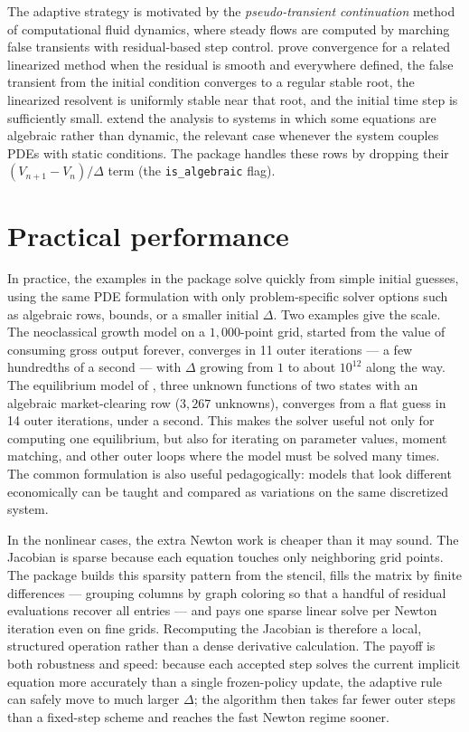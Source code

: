 \documentclass[11pt]{article}
\numberwithin{equation}{section}
\begin{document}
	The adaptive strategy is motivated by the \emph{pseudo-transient continuation} method of computational fluid dynamics, where steady flows are computed by marching false transients with residual-based step control. \citet{kelley1998convergence} prove convergence for a related linearized method when the residual is smooth and everywhere defined, the false transient from the initial condition converges to a regular stable root, the linearized resolvent is uniformly stable near that root, and the initial time step is sufficiently small. \citet{coffey2003pseudotransient} extend the analysis to systems in which some equations are algebraic rather than dynamic, the relevant case whenever the system couples PDEs with static conditions. The package handles these rows by dropping their $(V_{n+1}-V_n)/\Delta$ term (the \texttt{is\_algebraic} flag).

	\section{Practical performance}\label{sec:applications}

		In practice, the examples in the package solve quickly from simple initial guesses, using the same PDE formulation with only problem-specific solver options such as algebraic rows, bounds, or a smaller initial $\Delta$. Two examples give the scale. The neoclassical growth model on a $1{,}000$-point grid, started from the value of consuming gross output forever, converges in 11 outer iterations --- a few hundredths of a second --- with $\Delta$ growing from $1$ to about $10^{12}$ along the way. The equilibrium model of \citet{ditellabalance}, three unknown functions of two states with an algebraic market-clearing row ($3{,}267$ unknowns), converges from a flat guess in 14 outer iterations, under a second. This makes the solver useful not only for computing one equilibrium, but also for iterating on parameter values, moment matching, and other outer loops where the model must be solved many times. The common formulation is also useful pedagogically: models that look different economically can be taught and compared as variations on the same discretized system.

		In the nonlinear cases, the extra Newton work is cheaper than it may sound. The Jacobian is sparse because each equation touches only neighboring grid points. The package builds this sparsity pattern from the stencil, fills the matrix by finite differences --- grouping columns by graph coloring so that a handful of residual evaluations recover all entries --- and pays one sparse linear solve per Newton iteration even on fine grids. Recomputing the Jacobian is therefore a local, structured operation rather than a dense derivative calculation. The payoff is both robustness and speed: because each accepted step solves the current implicit equation more accurately than a single frozen-policy update, the adaptive rule can safely move to much larger $\Delta$; the algorithm then takes far fewer outer steps than a fixed-step scheme and reaches the fast Newton regime sooner.

	\small
	{
	
	
	}
\end{document}
